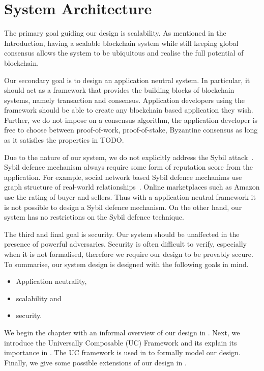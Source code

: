 \chapter{System Architecture}
\label{ch:model}

The primary goal guiding our design is scalability.
As mentioned in the Introduction, having a scalable blockchain system while still keeping global consensus
allows the system to be ubiquitous and realise the full potential of blockchain.

Our secondary goal is to design an application neutral system.
In particular, it should act as a framework that provides the building blocks of blockchain systems,
namely transaction and consensus.
Application developers using the framework should be able to create any blockchain based application they wish.
Further, we do not impose on a consensus algorithm,
the application developer is free to choose between proof-of-work, proof-of-stake,
Byzantine consensus as long as it  satisfies the properties in TODO.

Due to the nature of our system, we do not explicitly address the Sybil attack~\cite{douceur2002sybil}.
Sybil defence mechanism always require some form of reputation score from the application.
For example, social network based Sybil defence mechanims use graph structure of real-world relationships~\cite{yu2006sybilguard}.
Online marketplaces such as Amazon use the rating of buyer and sellers.
Thus with a application neutral framework it is not possible to design a Sybil defence mechanism.
On the other hand, our system has no restrictions on the Sybil defence technique.

The third and final goal is security.
Our system should be unaffected in the presence of powerful adversaries.
Security is often difficult to verify, especially when it is not formalised, therefore we require our design to be provably secure.
To summarise, our system design is designed with the following goals in mind.
\begin{itemize}
    \item Application neutrality,
    \item scalability and
    \item security.
\end{itemize}

We begin the chapter with an informal overview of our design in .
Next, we introduce the Universally Composable (UC) Framework and its explain its importance in .
The UC framework is used in  to formally model our design.
Finally, we give some possible extensions of our design in .

